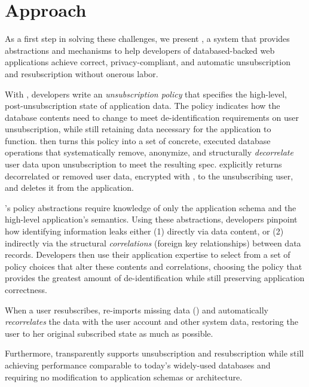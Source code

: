 \section{Approach}
As a first step in solving these challenges, we present \sys, a system that provides abstractions
and mechanisms to help developers of databased-backed web applications achieve correct,
privacy-compliant, and automatic unsubscription and resubscription without onerous labor.

With \sys, developers write an \emph{unsubscription policy} that specifies the high-level,
post-unsubscription state of application data.  The policy indicates how the database contents need
to change to meet de-identification requirements on user unsubscription, while still retaining data
necessary for the application to function. \sys then turns this policy into a set of concrete,
executed database operations that systematically remove, anonymize, and structurally
\emph{decorrelate} user data upon unsubscription to meet the resulting spec. \sys explicitly
returns decorrelated or removed user data, encrypted with , to the unsubscribing user, and
deletes it from the application.

\sys's policy abstractions require knowledge of only the application schema and the high-level
application's semantics. Using these abstractions, developers pinpoint how identifying information
leaks either (1) directly via data content, or (2) indirectly via the structural \emph{correlations}
(foreign key relationships) between data records. Developers then use their application expertise to
select from a set of policy choices that alter these contents and correlations, choosing the policy
that provides the greatest amount of de-identification while still preserving application
correctness.

When a user resubscribes, \sys re-imports missing data () and automatically
\emph{recorrelates} the data with the user account and other system data, restoring the user to her
original subscribed state as much as possible.

Furthermore, \sys transparently supports unsubscription and resubscription while still achieving performance
comparable to today’s widely-used databases and requiring no modification to application schemas or
architecture.
